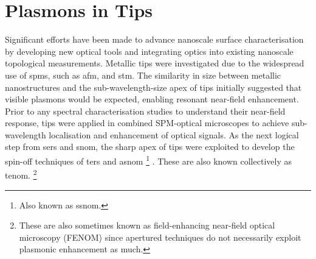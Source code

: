 \documentclass{article}
\begin{document}
\section{Plasmons in Tips}
\label{sec:tip_literature}

Significant efforts have been made to advance nanoscale surface characterisation by developing new optical tools and integrating optics into existing nanoscale topological measurements. Metallic tips were  investigated due to the widespread use of \glspl{spm}, such as \gls{afm}, and \gls{stm}. The similarity in size between metallic nanostructures and the sub-wavelength-size apex of tips initially suggested that visible plasmons would be expected, enabling resonant near-field enhancement. Prior to any spectral characterisation studies to understand their near-field response, tips were applied in combined SPM-optical microscopes to achieve sub-wavelength localisation and enhancement of optical signals. As the next logical step from \gls{sers} and \gls{snom}, the sharp apex of tips were exploited to develop the spin-off techniques of \gls{ters} \cite{stockle2000, anderson2000, hayazawa2000, pettinger2000} and \gls{asnom}%
\footnote{Also known as \gls{ssnom}.}
\cite{zenhausern1994, zenhausern1995, bachelot1995, knoll1997, knoll1998, keilmann1999}.
These are also known collectively as \gls{tenom}.%
\footnote{These are also sometimes known as field-enhancing near-field optical microscopy (FENOM) since apertured techniques do not necessarily exploit plasmonic enhancement as much.}
\end{document}
